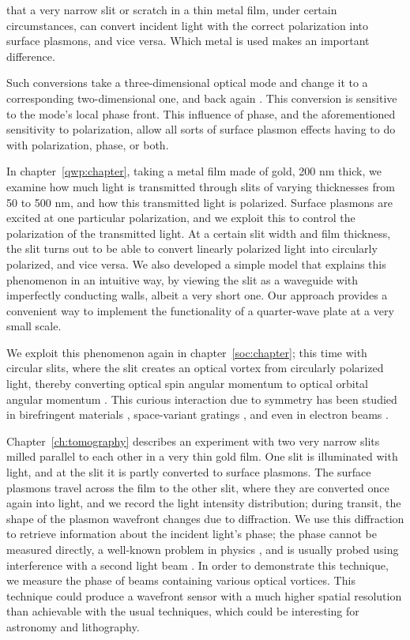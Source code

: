  \cite{Jasperson1969,SanchezGil1999,Lalanne2005,Schouten2005} that a very narrow slit or scratch in a thin metal film, under certain circumstances, can convert incident light with the correct polarization into surface plasmons, and vice versa.
Which metal is used makes an important difference.

Such conversions take a three-dimensional optical mode and change it to a corresponding two-dimensional one, and back again \cite{Altewischer2002}.
This conversion is sensitive to the mode's local phase front.
This influence of phase, and the aforementioned sensitivity to polarization, allow all sorts of surface plasmon effects having to do with polarization, phase, or both.

In chapter~\ref{qwp:chapter}, taking a metal film made of gold, 200 nm thick, we examine how much light is transmitted through slits of varying thicknesses from 50 to 500 nm, and how this transmitted light is polarized.
Surface plasmons are excited at one particular polarization, and we exploit this to control the polarization of the transmitted light.
At a certain slit width and film thickness, the slit turns out to be able to convert linearly polarized light into circularly polarized, and vice versa.
We also developed a simple model that explains this phenomenon in an intuitive way, by viewing the slit as a waveguide with imperfectly conducting walls, albeit a very short one.
Our approach provides a convenient way to implement the functionality of a quarter-wave plate at a very small scale.

We exploit this phenomenon again in chapter~\ref{soc:chapter}; this time with circular slits, where the slit creates an optical vortex from circularly polarized light, thereby converting optical spin angular momentum \cite{Beth1936} to optical orbital angular momentum \cite{Allen1992}.
This curious interaction due to symmetry has been studied in birefringent materials \cite{Ciattoni2003,Marrucci2006}, space-variant gratings \cite{Bomzon2001,Lombard2010}, and even in electron beams \cite{Karimi2012}.

Chapter~\ref{ch:tomography} describes an experiment with two very narrow slits milled parallel to each other in a very thin gold film.
One slit is illuminated with light, and at the slit it is partly converted to surface plasmons.
The surface plasmons travel across the film to the other slit, where they are converted once again into light, and we record the light intensity distribution; during transit, the shape of the plasmon wavefront changes due to diffraction.
We use this diffraction to retrieve information about the incident light's phase; the phase cannot be measured directly, a well-known problem in physics \cite{Fienup1982}, and is usually probed using interference with a second light beam \cite{Baranova1981}.
In order to demonstrate this technique, we measure the phase of beams containing various optical vortices.
This technique could produce a wavefront sensor with a much higher spatial resolution than achievable with the usual techniques, which could be interesting for astronomy and  lithography.

